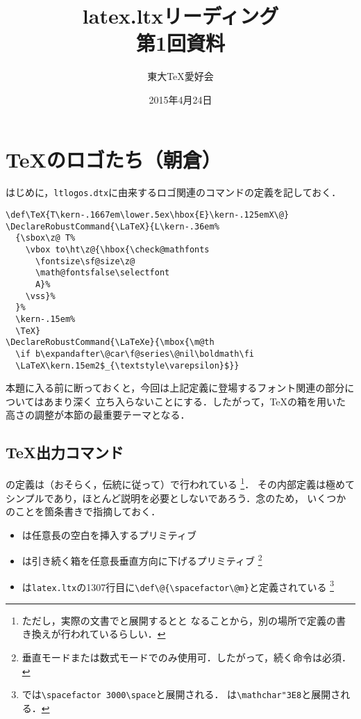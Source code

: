 \documentclass[autodetect-engine,dvipdfmx]{jsarticle}
\begin{document}
\title{ latex.ltxリーディング \\ 第1回資料 }
\author{ 東大\TeX 愛好会 }
\date{2015年4月24日}
\maketitle


\section{\TeX のロゴたち（朝倉）}

はじめに，\texttt{ltlogos.dtx}に由来するロゴ関連のコマンドの定義を記しておく．

\latexltx
\begin{lstlisting}[firstnumber=1327]
\def\TeX{T\kern-.1667em\lower.5ex\hbox{E}\kern-.125emX\@}
\DeclareRobustCommand{\LaTeX}{L\kern-.36em%
  {\sbox\z@ T%
    \vbox to\ht\z@{\hbox{\check@mathfonts
      \fontsize\sf@size\z@
      \math@fontsfalse\selectfont
      A}%
    \vss}%
  }%
  \kern-.15em%
  \TeX}
\DeclareRobustCommand{\LaTeXe}{\mbox{\m@th
  \if b\expandafter\@car\f@series\@nil\boldmath\fi
  \LaTeX\kern.15em2$_{\textstyle\varepsilon}$}}
\end{lstlisting}

本題に入る前に断っておくと，今回は上記定義に登場するフォント関連の部分についてはあまり深く
立ち入らないことにする．したがって，\TeX の箱を用いた高さの調整が本節の最重要テーマとなる．

\subsection{\TeX 出力コマンド}

の定義は（おそらく，伝統に従って）で行われている
\footnote{ただし，実際の文書でと展開するとと
なることから，別の場所で定義の書き換えが行われているらしい．}．
その内部定義は極めてシンプルであり，ほとんど説明を必要としないであろう．念のため，
いくつかのことを箇条書きで指摘しておく．

\begin{itemize}
\item {}は任意長の空白を挿入するプリミティブ
\item {}は引き続く箱を任意長垂直方向に下げるプリミティブ
	\footnote{垂直モードまたは数式モードでのみ使用可．したがって，続く命令は必須．}
\item {}は\texttt{latex.ltx}の1307行目に\verb|\def\@{\spacefactor\@m}|と定義されている
	\footnote{では\verb|\spacefactor 3000\space|と展開される．
	は\verb|\mathchar"3E8|と展開される．}
\end{itemize}
\end{document}
